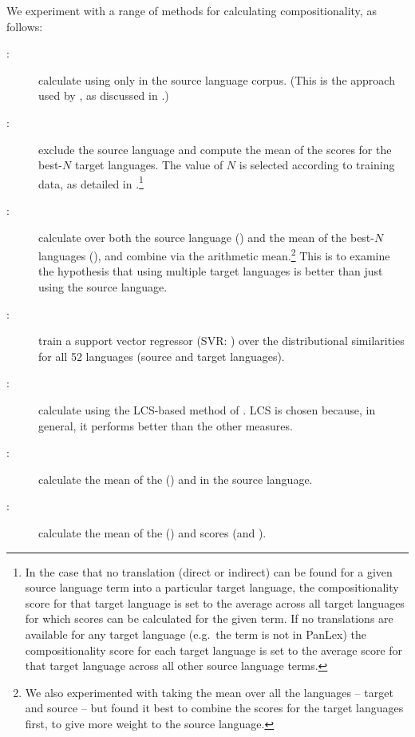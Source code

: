 \documentclass[output=paper
,modfonts
,nonflat]{langsci/langscibook}
\begin{document}
We experiment with a range of methods for calculating
compositionality, as follows:
\begin{description}
\item[\CSsource:] calculate  using only
   in the source language corpus. (This is
  the approach used by \citet{reddy2011a}, as discussed in .)
\item[\CStarg:] exclude the source language and compute the mean of
  the  scores for the best-$N$ target
  languages. The value of $N$ is selected according to training data,
  as detailed in .\footnote{In the case
    that no translation (direct or indirect) can be found for a given
    source language term into a particular target language, the
    compositionality score for that target language is set to the
    average across all target languages for which scores can be
    calculated for the given term. If no translations are available
    for any target language (e.g.\ the term is not in PanLex) the
    compositionality score for each target language is set to the
    average score for that target language across all other source
    language terms.}
\item[\CSsourcetarg:] calculate  over both the
  source language (\CSsource) and the mean of the best-$N$ languages
  (\CStarg), and combine via the arithmetic mean.\footnote{We also
    experimented with taking the mean over all the languages -- target
    and source -- but found it best to combine the scores for the
    target languages first, to give more weight to the source language.}
  This is to examine the hypothesis that using multiple target languages
  is better than just using the source language.
\item[\CSsvr:] train a support vector regressor (SVR:
  \citet{Smola:Scholkopf:2004}) over the distributional similarities
  for all 52 languages (source and target languages).
\item[\CSstring:] calculate  using the LCS-based method
  of . 
	LCS is chosen because, in general, it performs better than 
	the other  measures.
\item[\CSstringDS:] calculate the mean of the  (\CSstring)
  and  in the source language.
\item[\CSall:] calculate the mean of the  (\CSstring)
  and  scores (\CSsource and \CStarg).
\end{description}
\end{document}
